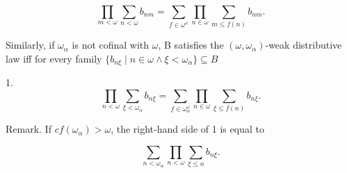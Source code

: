 $$\prod_{m < \omega} \sum_{n < \omega} b_{nm} = \sum_{f \in \omega^{\omega}} \prod_{n \in \omega} \sum_{m \leq f(n)} b_{nm}.$$

Similarly, if $\omega_{\alpha}$ is not cofinal with $\omega$, B satisfies the $(\omega, \omega_{\alpha})$-weak distributive law iff for every family $\{b_{n\xi} \mid n \in \omega \land \xi < \omega_{\alpha}\} \subseteq B$

1. $$\prod_{n < \omega} \sum_{\xi < \omega_{\alpha}} b_{n\xi} = \sum_{f \in \omega_{\alpha}^{\omega}} \prod_{n \in \omega} \sum_{\xi \leq f(n)} b_{n\xi}.$$

Remark. If $cf(\omega_{\alpha}) > \omega$, the right-hand side of 1 is equal to

$$\sum_{n < \omega_{\alpha}} \prod_{n < \omega} \sum_{\xi \leq n} b_{n\xi}.$$
